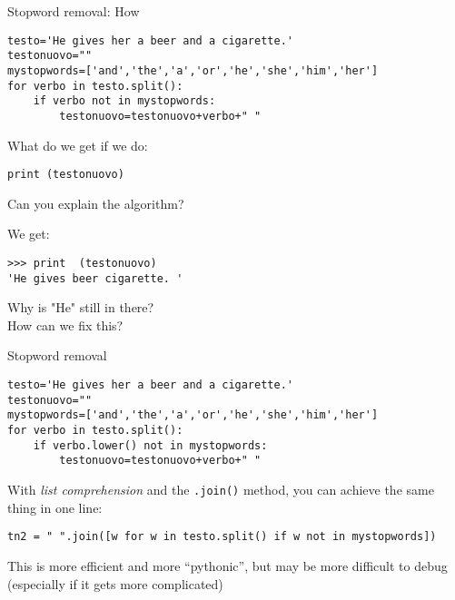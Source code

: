 \documentclass{beamer}
\begin{document}
\begin{frame}[fragile]{Stopword removal: How}
\begin{lstlisting}
testo='He gives her a beer and a cigarette.'
testonuovo=""
mystopwords=['and','the','a','or','he','she','him','her']
for verbo in testo.split():
    if verbo not in mystopwords:
        testonuovo=testonuovo+verbo+" "
\end{lstlisting}
What do we get if we do:
\begin{lstlisting}
print (testonuovo)
\end{lstlisting}
Can you explain the algorithm?
\end{frame}

\begin{frame}[fragile]{We get:}
\begin{lstlisting}
>>> print  (testonuovo)
'He gives beer cigarette. '
\end{lstlisting}
Why is "He" still in there? \\ How can we fix this?
\end{frame}

\begin{frame}[fragile]{Stopword removal}
\begin{lstlisting}
testo='He gives her a beer and a cigarette.'
testonuovo=""
mystopwords=['and','the','a','or','he','she','him','her']
for verbo in testo.split():
    if verbo.lower() not in mystopwords:
        testonuovo=testonuovo+verbo+" "
\end{lstlisting}

\pause

With \textit{list comprehension} and the \texttt{.join()} method, you can achieve the same thing in one line:

\begin{lstlisting}
tn2 = " ".join([w for w in testo.split() if w not in mystopwords])
\end{lstlisting}
\pause
This is more efficient and more ``pythonic'', but may be more difficult to debug (especially if it gets more complicated)

\end{frame}
\end{document}

